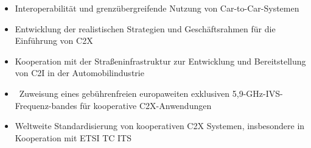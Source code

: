 \begin{itemize}
	\item Interoperabilität und grenzübergreifende Nutzung von Car-to-Car-Systemen
	\item Entwicklung der realistischen Strategien und Geschäftsrahmen für die Einführung von C2X
	\item Kooperation mit der Straßeninfrastruktur zur Entwicklung und Bereitstellung von C2I in der Automobilindustrie
	\item  Zuweisung eines gebührenfreien europaweiten exklusiven 5,9-GHz-IVS-Frequenz-bandes für kooperative C2X-Anwendungen
	\item Weltweite Standardisierung von kooperativen C2X Systemen, insbesondere in Kooperation mit ETSI TC ITS
\end{itemize}



%

